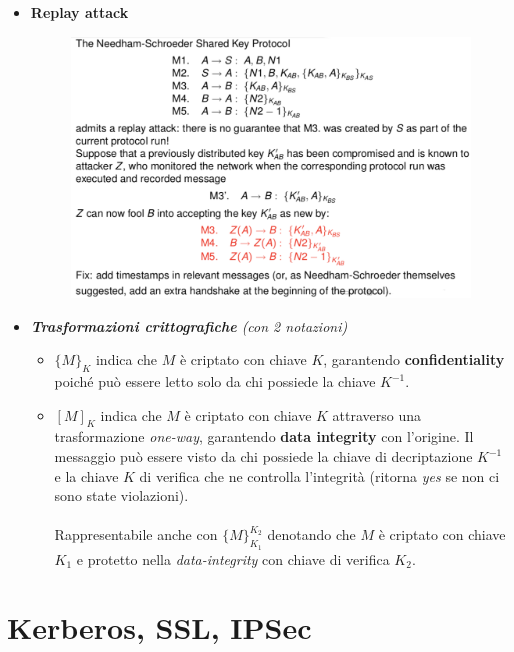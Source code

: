 \documentclass[11pt, a4paper, twoside, italian]{report}
\theoremstyle{plain}
\begin{document}
\begin{multicols}{2}
\begin{itemize}
	\item \textbf{Replay attack}
	\begin{figure}[H]
		\centering
		\includegraphics[scale=0.55]{replayattack}
	\end{figure}
\end{itemize}
\columnbreak
\begin{itemize}
	\item \textit{\textbf{Trasformazioni crittografiche} (con 2 notazioni)}
	\begin{itemize}
		\item $\{ M \}_K$ indica che $M$ è criptato con chiave $K$, garantendo \textbf{confidentiality} poiché può essere letto solo da chi possiede la chiave $K^{-1}$.
		\item $[ M ]_K$ indica che $M$ è criptato con chiave $K$ attraverso una trasformazione \textit{one-way}, garantendo \textbf{data integrity} con l'origine. Il messaggio può essere visto da chi possiede la chiave di decriptazione $K^{-1}$ e la chiave $K$ di verifica che ne controlla l'integrità (ritorna \textit{yes} se non ci sono state violazioni).\\\\
		Rappresentabile anche con $\{ M \}_{K_1}^{K_2}$ denotando che $M$ è criptato con chiave $K_1$ e protetto nella \textit{data-integrity} con chiave di verifica $K_2$.
	\end{itemize}
\end{itemize}
\end{multicols}



\chapter*{Kerberos, SSL, IPSec}
\end{document}
